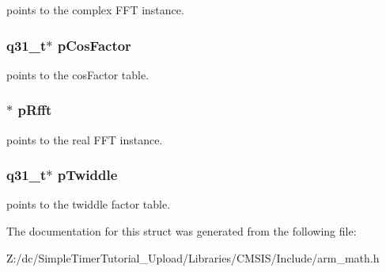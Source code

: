 points to the complex F\-F\-T instance. \hypertarget{structarm__dct4__instance__q31_af06acf18dc6547fc29aba2eb68cc63f0}{
\subsubsection[{p\-Cos\-Factor}]{\setlength{\rightskip}{0pt plus 5cm}q31\-\_\-t$\ast$ p\-Cos\-Factor}}\label{structarm__dct4__instance__q31_af06acf18dc6547fc29aba2eb68cc63f0}
points to the cos\-Factor table. \hypertarget{structarm__dct4__instance__q31_a16c74f8496e1691e62da3c57e0c676eb}{
\subsubsection[{p\-Rfft}]{$\ast$ p\-Rfft}}\label{structarm__dct4__instance__q31_a16c74f8496e1691e62da3c57e0c676eb}
points to the real F\-F\-T instance. \hypertarget{structarm__dct4__instance__q31_a2505b7d5ec077b244c712797a5253b6d}{
\subsubsection[{p\-Twiddle}]{\setlength{\rightskip}{0pt plus 5cm}q31\-\_\-t$\ast$ p\-Twiddle}}\label{structarm__dct4__instance__q31_a2505b7d5ec077b244c712797a5253b6d}
points to the twiddle factor table. 

The documentation for this struct was generated from the following file\-:\begin{DoxyCompactItemize}
\item 
Z\-:/dc/\-Simple\-Timer\-Tutorial\-\_\-\-Upload/\-Libraries/\-C\-M\-S\-I\-S/\-Include/arm\-\_\-math.\-h\end{DoxyCompactItemize}
